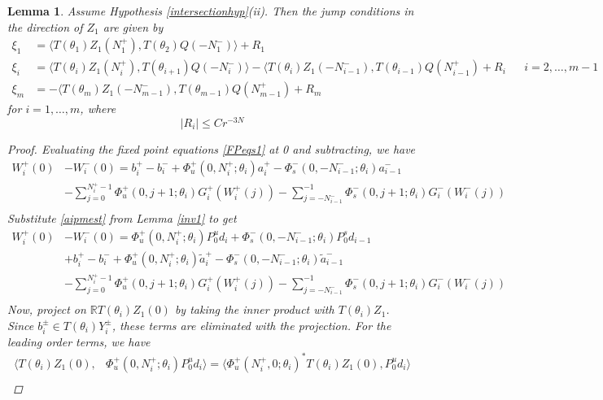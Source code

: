 \documentclass[12pt]{article}
\def\R{{\mathbb R}}
\newtheorem{lemma}{Lemma}
\begin{document}
\begin{lemma}\label{jumpZlemma}
Assume Hypothesis \ref{intersectionhyp}(ii). Then the jump conditions in the direction of $Z_1$ are given by
\begin{equation}\label{jumpZ}
\begin{aligned}
\xi_1 &= \langle T(\theta_1) Z_1(N_1^+), T(\theta_2) Q(-N_1^-) \rangle + R_1  \\
\xi_i &= \langle T(\theta_i) Z_1(N_i^+), T(\theta_{i+1}) Q(-N_i^-) \rangle
- \langle T(\theta_i) Z_1(-N_{i-1}^-), T(\theta_{i-1}) Q(N_{i-1}^+) + R_i &&
i = 2, \dots, m-1 \\
\xi_m &= -\langle T(\theta_m) Z_1(-N_{m-1}^-), T(\theta_{m-1}) Q(N_{m-1}^+) + R_m
\end{aligned}
\end{equation}
for $i = 1, \dots, m$, where 
\[
|R_i| \leq C r^{-3N}
\]
\begin{proof}
Evaluating the fixed point equations \eqref{FPeqs1} at 0 and subtracting, we have
\begin{align*}
W_i^+(0) &- W_i^-(0) = b_i^+ - b_i^- 
+ \Phi_u^+(0, N_i^+; \theta_i) a_i^+ - \Phi_s^-(0, -N_{i-1}^-; \theta_i) a_{i-1}^- \\
&- \sum_{j = 0}^{N_i^+-1} \Phi_u^+(0, j+1; \theta_i) G_i^+(W_i^+(j)) 
- \sum_{j = -N_{i-1}^-}^{-1} \Phi_s^-(0, j+1; \theta_i) G_i^-(W_i^-(j)) \\
\end{align*}
Substitute \eqref{aipmest} from Lemma \ref{inv1} to get
\begin{align*}
W_i^+(0) &- W_i^-(0) = \Phi_u^+(0, N_i^+; \theta_i) P_0^u d_i + \Phi_s^-(0, -N_{i-1}^-; \theta_i) P_0^s d_{i-1} \\
&+ b_i^+ - b_i^- 
+ \Phi_u^+(0, N_i^+; \theta_i) \tilde{a}_i^+ - \Phi_s^-(0, -N_{i-1}^-; \theta_i) \tilde{a}_{i-1}^- \\
&- \sum_{j = 0}^{N_i^+-1} \Phi_u^+(0, j+1; \theta_i) G_i^+(W_i^+(j)) 
- \sum_{j = -N_{i-1}^-}^{-1} \Phi_s^-(0, j+1; \theta_i) G_i^-(W_i^-(j)) \\
\end{align*}
Now, project on $\R T(\theta_i) Z_1(0)$ by taking the inner product with $T(\theta_i) Z_1$. Since $b_i^\pm \in T(\theta_i) Y_i^\pm$, these terms are eliminated with the projection. For the leading order terms, we have
\begin{align*}
\langle T(\theta_i) Z_1(0), &\Phi_u^+(0, N_i^+; \theta_i) P_0^u d_i \rangle
= \langle \Phi_u^+(N_i^+, 0; \theta_i)^* T(\theta_i) Z_1(0), P_0^u d_i \rangle \\

\end{align*}
\end{proof}
\end{lemma}
\end{document}
